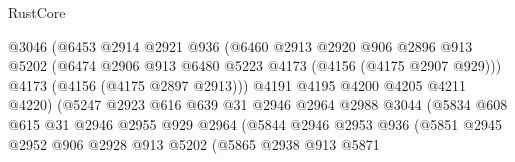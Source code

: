 \begin{lexlean}{RustCore}
\begin{coremodule}
                                  @3046
                                  (@6453
                                    @2914
                                    @2921
                                    @936
                                    (@6460
                                      @2913
                                      @2920
                                      @906
                                      @2896
                                      @913
                                      @5202
                                      (@6474
                                        @2906
                                        @913
                                        @6480
                                        @5223
                                        @4173
                                        (@4156 (@4175 @2907 @929)))
                                      @4173
                                      (@4156 (@4175 @2897 @2913)))
                                    @4191
                                    @4195
                                    @4200
                                    @4205
                                    @4211
                                    @4220)
                                  (@5247
                                    @2923
                                    @616
                                    @639
                                    @31
                                    @2946
                                    @2964
                                    @2988
                                    @3044
                                    (@5834
                                      @608
                                      @615
                                      @31
                                      @2946
                                      @2955
                                      @929
                                      @2964
                                      (@5844
                                        @2946
                                        @2953
                                        @936
                                        (@5851
                                          @2945
                                          @2952
                                          @906
                                          @2928
                                          @913
                                          @5202
                                          (@5865
                                            @2938
                                            @913
                                            @5871

\end{coremodule}
\end{lexlean}
